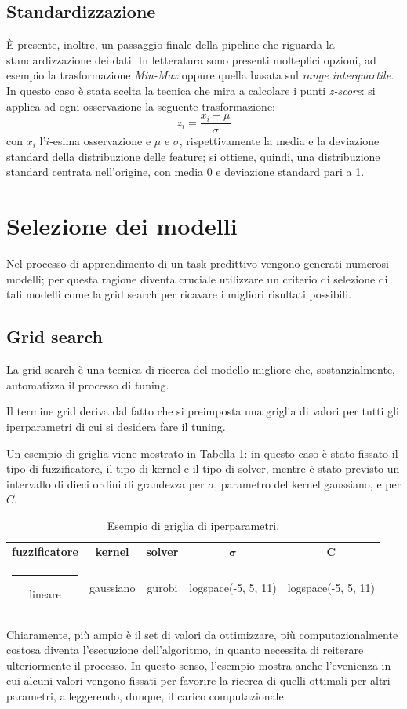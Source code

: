 \documentclass[12pt]{report}
\makeatletter
\theoremstyle{definition}
\newcommand{\thickhline}{%
    \noalign {\ifnum 0=`}\fi \hrule height 1pt
    \futurelet \reserved@a \@xhline
}
\makeatother
\begin{document}
\subsection{Standardizzazione}\label{standardization}
È presente, inoltre, un passaggio finale della pipeline che riguarda la standardizzazione dei dati. In letteratura sono presenti molteplici opzioni, ad esempio la trasformazione \textit{Min-Max} oppure quella basata sul \textit{range interquartile}. In questo caso è stata scelta la tecnica che mira a calcolare i punti \textit{z-score}: si applica ad ogni osservazione la seguente trasformazione:
\begin{equation}
    z_i = \frac{x_i - \mu}{\sigma}
\end{equation}
con $x_i$ l'$i$-esima osservazione e $\mu$ e $\sigma$, rispettivamente la media e la deviazione standard della distribuzione delle feature; si ottiene, quindi, una distribuzione standard centrata nell'origine, con media 0 e deviazione standard pari a 1.

\section{Selezione dei modelli}\label{modelselection}
Nel processo di apprendimento di un task predittivo vengono generati numerosi modelli; per questa ragione diventa cruciale utilizzare un criterio di selezione di tali modelli come la grid search per ricavare i migliori risultati possibili.

\subsection{Grid search}\label{gs}
La grid search è una tecnica di ricerca del modello migliore che, sostanzialmente, automatizza il processo di tuning.

Il termine grid deriva dal fatto che si preimposta una griglia di valori per tutti gli iperparametri di cui si desidera fare il tuning.

Un esempio di griglia viene mostrato in Tabella \ref{grid}: in questo caso è stato fissato il tipo di fuzzificatore, il tipo di kernel e il tipo di solver, mentre è stato previsto un intervallo di dieci ordini di grandezza per $\sigma$, parametro del kernel gaussiano, e per $C$.
\begin{table}[!h]
\centering
 \begin{tabular}{|c|c|c|c|c|} 
 \hline
\textbf{fuzzificatore} & \textbf{kernel} & \textbf{solver} & $\bm{\sigma}$ & $\mathbf{C}$ 
\\ [0.5ex] 
 \thickhline
 lineare & gaussiano & gurobi & logspace(-5, 5, 11) & logspace(-5, 5, 11) \\ 
 \hline
\end{tabular}
\caption{Esempio di griglia di iperparametri.}
\label{grid}
\end{table}
Chiaramente, più ampio è il set di valori da ottimizzare, più computazionalmente costosa diventa l'esecuzione dell'algoritmo, in quanto necessita di reiterare ulteriormente il processo. In questo senso, l'esempio mostra anche l'evenienza in cui alcuni valori vengono fissati per favorire la ricerca di quelli ottimali per altri parametri, alleggerendo, dunque, il carico computazionale.
\end{document}
